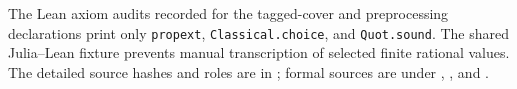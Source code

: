 The Lean axiom audits recorded for the tagged-cover and preprocessing
declarations print only \texttt{propext}, \texttt{Classical.choice}, and
\texttt{Quot.sound}. The shared Julia--Lean fixture prevents manual
transcription of selected finite rational values. The detailed source hashes
and roles are in ; formal sources are under
,
, and
.
